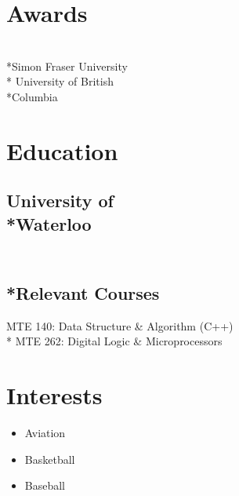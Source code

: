 \documentclass[]{morris-cv}
\begin{document}
\begin{minipage}[t]{0.25\textwidth}
\section{Awards}
\\*Simon Fraser University 
\bigskip
\def\nespace{\hskip\fontdimen2\font\relax}
\\* University of British \\*Columbia

\section{Education}
\subsection*{University of
\\*Waterloo}

\subsection{\\*Relevant Courses}
MTE 140: Data Structure \& Algorithm (C++)
\bigskip
\\* MTE 262:  Digital Logic \& Microprocessors

\section {Interests}
\begin{itemize}
    \setlength\itemsep{-0.2em}
        \item Aviation
        \item Basketball
        \item Baseball
\end{itemize}
\sectionsep

%
%

\end{minipage} 
\end{document}
